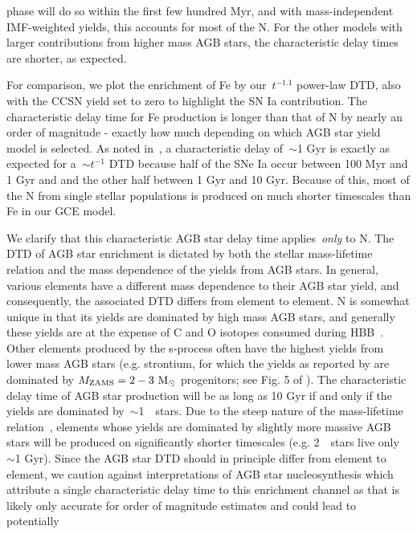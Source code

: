 \documentclass[ms.tex]{subfiles}
\begin{document}
phase will do so within the first few hundred Myr, and with mass-independent
IMF-weighted yields, this accounts for most of the N.
For the other models with larger contributions from higher mass AGB stars, the
characteristic delay times are shorter, as expected.
\par
For comparison, we plot the enrichment of Fe by our~$t^{-1.1}$ power-law DTD,
also with the CCSN yield set to zero to highlight the SN Ia contribution.
The characteristic delay time for Fe production is longer than that of N by
nearly an order of magnitude - exactly how much depending on which AGB star
yield model is selected.
As noted in~\citet{Johnson2021}, a characteristic delay of~$\sim$1 Gyr is
exactly as expected for a~$\sim t^{-1}$ DTD because half of the SNe Ia occur
between 100 Myr and 1 Gyr and and the other half between 1 Gyr and 10 Gyr.
Because of this, most of the N from single stellar populations is produced on
much shorter timescales than Fe in our GCE model.
\par
We clarify that this characteristic AGB star delay time applies~\textit{only}
to N.
The DTD of AGB star enrichment is dictated by both the stellar mass-lifetime
relation and the mass dependence of the yields from AGB stars.
In general, various elements have a different mass dependence to their AGB
star yield, and consequently, the associated DTD differs from element to
element.
N is somewhat unique in that its yields are dominated by high mass AGB stars,
and generally these yields are at the expense of C and O isotopes consumed
during HBB~\citep{Ventura2013}.
Other elements produced by the s-process often have the highest yields from
lower mass AGB stars (e.g. strontium, for which the yields as reported by
\citealp{Cristallo2011, Cristallo2015} are dominated by
$M_\text{ZAMS} = 2 - 3~\text{M}_\odot$ progenitors; see Fig. 5 of
\citealp{Johnson2020}).
The characteristic delay time of AGB star production will be as long as 10 Gyr
if and only if the yields are dominated by~$\sim$1~\msun~stars.
Due to the steep nature of the mass-lifetime relation~\citep[e.g.][]{Larson1974,
Maeder1989, Padovani1993}, elements whose yields are dominated by slightly more
massive AGB stars will be produced on significantly shorter timescales (e.g.
2~\msun~stars live only~$\sim$1 Gyr).
Since the AGB star DTD should in principle differ from element to element, we
caution against interpretations of AGB star nucleosynthesis which attribute
a single characteristic delay time to this enrichment channel as that is likely
only accurate for order of magnitude estimates and could lead to potentially
\end{document}
